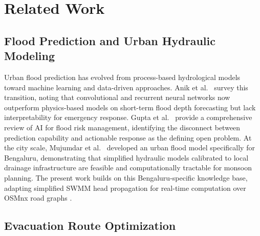 \documentclass[journal]{IEEEtran}
\begin{document}
\section{Related Work}
\label{sec:related}

\subsection{Flood Prediction and Urban Hydraulic Modeling}

Urban flood prediction has evolved from process-based hydrological models toward machine
learning and data-driven approaches. Anik et al.\ \cite{anik2025evolution} survey this
transition, noting that convolutional and recurrent neural networks now outperform
physics-based models on short-term flood depth forecasting but lack interpretability for
emergency response. Gupta et al.\ \cite{gupta2025ai} provide a comprehensive review of AI
for flood risk management, identifying the disconnect between prediction capability and
actionable response as the defining open problem. At the city scale, Mujumdar et al.\
\cite{mujumdar2021bengaluru} developed an urban flood model specifically for Bengaluru,
demonstrating that simplified hydraulic models calibrated to local drainage infrastructure
are feasible and computationally tractable for monsoon planning. The present work builds on
this Bengaluru-specific knowledge base, adapting simplified SWMM head propagation for
real-time computation over OSMnx road graphs \cite{rossman2010}.

\subsection{Evacuation Route Optimization}
\end{document}
